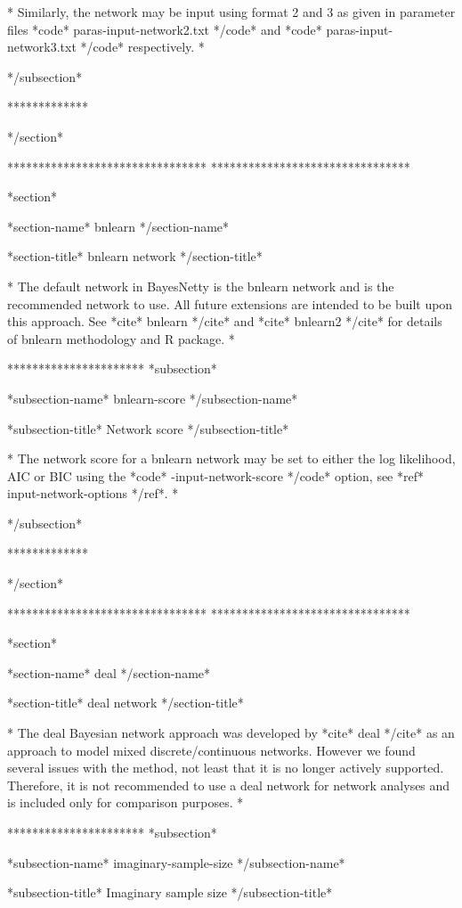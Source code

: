 * Similarly, the network may be input using format 2 and 3 as given in parameter files *code* paras-input-network2.txt */code* and *code* paras-input-network3.txt */code* respectively. *

*/subsection*

*************

*/section*

******************************** ********************************

*section*

*section-name* bnlearn */section-name*

*section-title* bnlearn network */section-title*

* The default network in BayesNetty is the bnlearn network and is the recommended network to use. All future extensions are intended to be built upon this approach. See *cite* bnlearn */cite* and *cite* bnlearn2 */cite* for details of bnlearn methodology and R package. *

********************** *subsection*

*subsection-name* bnlearn-score */subsection-name*

*subsection-title* Network score */subsection-title*

* The network score for a bnlearn network may be set to either the log likelihood, AIC or BIC using the *code* -input-network-score */code* option, see *ref* input-network-options */ref*. *


*/subsection*

*************

*/section*

******************************** ********************************

*section*

*section-name* deal */section-name*

*section-title* deal network */section-title*

* The deal Bayesian network approach was developed by *cite* deal */cite* as an approach to model mixed discrete/continuous networks. However we found several issues with the method, not least that it is no longer actively supported. Therefore, it is not recommended to use a deal network for network analyses and is included only for comparison purposes. *


********************** *subsection*

*subsection-name* imaginary-sample-size */subsection-name*

*subsection-title* Imaginary sample size */subsection-title*

